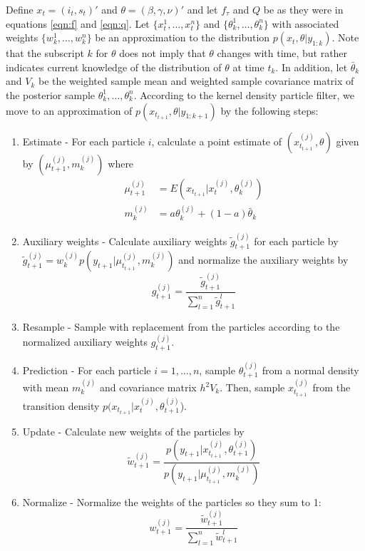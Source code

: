 \documentclass{article}
\begin{document}
Define $x_t = (i_t,s_t)'$ and $\theta = (\beta,\gamma,\nu)'$ and let $f_\tau$ and $Q$ be as they were in equations \eqref{eqn:f} and \eqref{eqn:q}.  Let $\{x_t^1,\ldots,x_t^n\}$ and $\{\theta_k^1,\ldots,\theta_k^n\}$ with associated weights $\{w_k^1,\ldots,w_k^n\}$ be an approximation to the distribution $p(x_t,\theta|y_{1:k})$.  Note that the subscript $k$ for $\theta$ does not imply that $\theta$ changes with time, but rather indicates current knowledge of the distribution of $\theta$ at time $t_k$.  In addition, let $\bar{\theta}_k$ and $V_k$ be the weighted sample mean and weighted sample covariance matrix of the posterior sample ${\theta_k^1,\ldots,\theta_k^n}$.  According to the kernel density particle filter, we move to an approximation of $p(x_{t_{t+1}},\theta|y_{1:{k+1}})$ by the following steps:

\begin{enumerate}
\item Estimate - For each particle $i$, calculate a point estimate of $(x_{t_{t+1}}^{(j)},\theta)$ given by $(\mu_{t+1}^{(j)},m_k^{(j)})$ where
    \begin{align*}
    \mu_{t+1}^{(j)} &= E(x_{t_{t+1}}|x_t^{(j)},\theta_k^{(j)}) \\
    m_k^{(j)} &= a\theta_k^{(j)} + (1-a)\bar{\theta}_k
    \end{align*}
\item Auxiliary weights - Calculate auxiliary weights $\tilde{g}_{t+1}^{(j)}$ for each particle by $\tilde{g}_{t+1}^{(j)} = w_k^{(j)} p(y_{t+1}|\mu_{t_{t+1}}^{(j)},m_k^{(j)})$ and normalize the auxiliary weights by \[g_{t+1}^{(j)} = \frac{\tilde{g}_{t+1}^{(j)}}{\sum_{l=1}^n \tilde{g}_{t+1}^l}\]
\item Resample - Sample with replacement from the particles according to the normalized auxiliary weights $g_{t+1}^{(j)}$.
\item Prediction - For each particle $i = {1,\ldots,n}$, sample $\theta_{t+1}^{(j)}$ from a normal density with mean $m_k^{(j)}$ and covariance matrix $h^2V_k$.  Then, sample $x_{t_{t+1}}^{(j)}$ from the transition density $p(x_{t_{t+1}}|x_t^{(j)},\theta_{t+1}^{(j)}$).
\item Update - Calculate new weights of the particles by \[\tilde{w}_{t+1}^{(j)} = \frac{p(y_{t+1}|x_{t_{t+1}}^{(j)},\theta_{t+1}^{(j)})}{p(y_{t+1}|\mu_{t_{t+1}}^{(j)},m_k^{(j)})}\]
\item Normalize - Normalize the weights of the particles so they sum to 1: \[w_{t+1}^{(j)} = \frac{\tilde{w}_{t+1}^{(j)}}{\sum_{l=1}^n \tilde{w}_{t+1}^l}\]
\end{enumerate}
\end{document}
